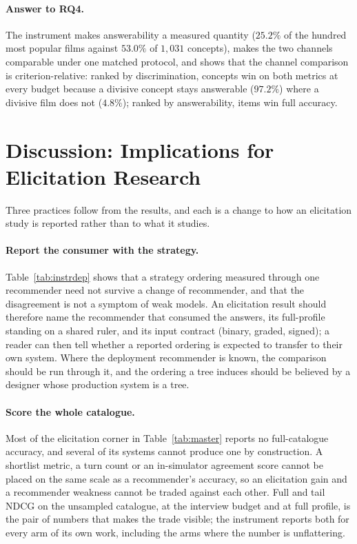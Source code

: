 \documentclass[manuscript,screen]{acmart}
\begin{document}
\paragraph{Answer to RQ4.} The instrument makes answerability a measured quantity ($25.2\%$ of the hundred most popular films against $53.0\%$ of $1{,}031$ concepts), makes the two channels comparable under one matched protocol, and shows that the channel comparison is criterion-relative: ranked by discrimination, concepts win on both metrics at every budget because a divisive concept stays answerable ($97.2\%$) where a divisive film does not ($4.8\%$); ranked by answerability, items win full accuracy.

\section{Discussion: Implications for Elicitation Research}\label{sec:discussion}

Three practices follow from the results, and each is a change to how an elicitation study is reported rather than to what it studies.

\paragraph{Report the consumer with the strategy.} Table~\ref{tab:instrdep} shows that a strategy ordering measured through one recommender need not survive a change of recommender, and that the disagreement is not a symptom of weak models. An elicitation result should therefore name the recommender that consumed the answers, its full-profile standing on a shared ruler, and its input contract (binary, graded, signed); a reader can then tell whether a reported ordering is expected to transfer to their own system. Where the deployment recommender is known, the comparison should be run through it, and the ordering a tree induces should be believed by a designer whose production system is a tree.

\paragraph{Score the whole catalogue.} Most of the elicitation corner in Table~\ref{tab:master} reports no full-catalogue accuracy, and several of its systems cannot produce one by construction. A shortlist metric, a turn count or an in-simulator agreement score cannot be placed on the same scale as a recommender's accuracy, so an elicitation gain and a recommender weakness cannot be traded against each other. Full and tail NDCG on the unsampled catalogue, at the interview budget and at full profile, is the pair of numbers that makes the trade visible; the instrument reports both for every arm of its own work, including the arms where the number is unflattering.
\end{document}
